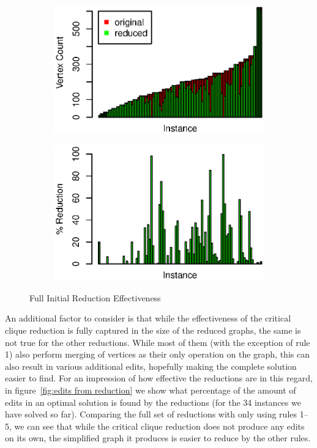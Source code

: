 \documentclass{article}
\theoremstyle{definition}
\begin{document}
\begin{figure}[h]
	\begin{subfigure}{0.49\textwidth}
		\includegraphics[width=1.0\linewidth]{full_initial_absolute}
	\end{subfigure}
	\begin{subfigure}{0.49\textwidth}
		\includegraphics[width=1.0\linewidth]{full_initial_percent}
	\end{subfigure}
	\caption{Full Initial Reduction Effectiveness}
	\label{fig:initial eff}
\end{figure}

An additional factor to consider is that while the effectiveness of the critical clique reduction is
fully captured in the size of the reduced graphs, the same is not true for the other reductions.
While most of them (with the exception of rule 1) also perform merging of vertices as their only
operation on the graph, this can also result in various additional edits, hopefully making the
complete solution easier to find. For an impression of how effective the reductions are in this
regard, in figure~\ref{fig:edits from reduction} we show what percentage of the amount of edits in
an optimal solution is found by the reductions (for the 34 instances we have solved so far).
Comparing the full set of reductions with only using rules 1--5, we can see that while the critical
clique reduction does not produce any edits on its own, the simplified graph it produces is easier
to reduce by the other rules.
\end{document}
